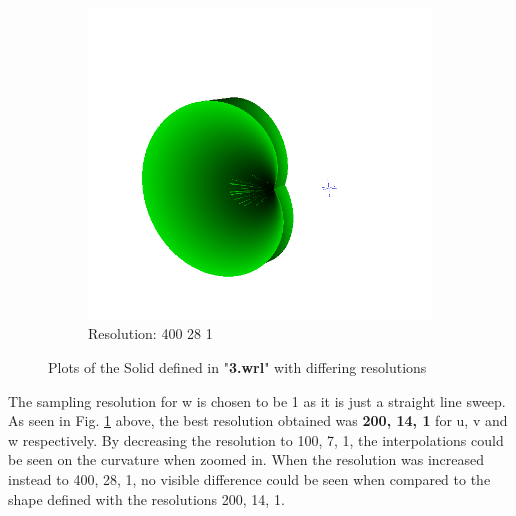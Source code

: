 \documentclass[acmlarge,nonacm=true]{acmart}
\begin{document}
\begin{figure}[H]
\begin{subfigure}{.33\textwidth}
		\includegraphics[width=.8\linewidth]{fig/3_400_28_1}
		\caption{Resolution: 400 28 1}
	  \end{subfigure}
	\caption{Plots of the Solid defined in "\textbf{3.wrl}" with differing resolutions}
	\label{fig:3}
\end{figure}

The sampling resolution for w is chosen to be 1 as it is just a straight line sweep. 
As seen in Fig. \ref{fig:3} above, the best resolution obtained was \textbf{200, 14, 1} for u, v and w respectively.
By decreasing the resolution to 100, 7, 1, the interpolations could be seen on the curvature when zoomed in. When the resolution was increased
instead to 400, 28, 1, no visible difference could be seen when compared to the shape defined with the resolutions 200, 14, 1.


\newpage
\end{document}
